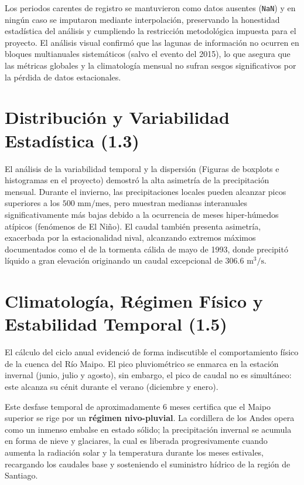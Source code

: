 \documentclass[11pt,letterpaper]{article}
\begin{document}
Los periodos carentes de registro se mantuvieron como datos ausentes (\texttt{NaN}) y en ningún caso se imputaron mediante interpolación, preservando la honestidad estadística del análisis y cumpliendo la restricción metodológica impuesta para el proyecto. El análisis visual confirmó que las lagunas de información no ocurren en bloques multianuales sistemáticos (salvo el evento del 2015), lo que asegura que las métricas globales y la climatología mensual no sufran sesgos significativos por la pérdida de datos estacionales.

\section{Distribución y Variabilidad Estadística (1.3)}

El análisis de la variabilidad temporal y la dispersión (Figuras de boxplots e histogramas en el proyecto) demostró la alta asimetría de la precipitación mensual. Durante el invierno, las precipitaciones locales pueden alcanzar picos superiores a los $500\text{ mm/mes}$, pero muestran medianas interanuales significativamente más bajas debido a la ocurrencia de meses hiper-húmedos atípicos (fenómenos de El Niño). El caudal también presenta asimetría, exacerbada por la estacionalidad nival, alcanzando extremos máximos documentados como el de la tormenta cálida de mayo de 1993, donde precipitó líquido a gran elevación originando un caudal excepcional de $306.6\text{ m}^3/\text{s}$.

\section{Climatología, Régimen Físico y Estabilidad Temporal (1.5)}

El cálculo del ciclo anual evidenció de forma indiscutible el comportamiento físico de la cuenca del Río Maipo. El pico pluviométrico se enmarca en la estación invernal (junio, julio y agosto), sin embargo, el pico de caudal no es simultáneo: este alcanza su cénit durante el verano (diciembre y enero).

Este desfase temporal de aproximadamente 6 meses certifica que el Maipo superior se rige por un \textbf{régimen nivo-pluvial}. La cordillera de los Andes opera como un inmenso embalse en estado sólido; la precipitación invernal se acumula en forma de nieve y glaciares, la cual es liberada progresivamente cuando aumenta la radiación solar y la temperatura durante los meses estivales, recargando los caudales base y sosteniendo el suministro hídrico de la región de Santiago.
\end{document}
